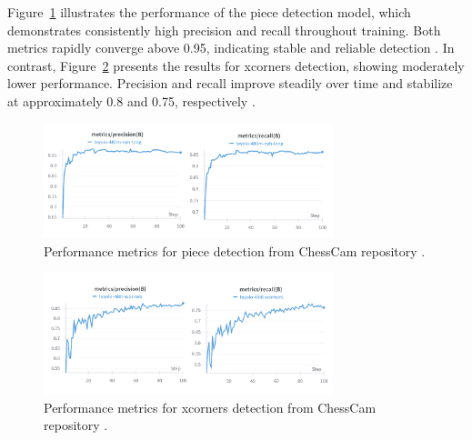 Figure~\ref{fig:chesscam-piece-metrics} illustrates the performance of the piece detection model, which demonstrates consistently high precision and recall throughout training. Both metrics rapidly converge above 0.95, indicating stable and reliable detection \cite{wandb:piece-detection}. In contrast, Figure~\ref{fig:chesscam-xcorners-metrics} presents the results for xcorners detection, showing moderately lower performance. Precision and recall improve steadily over time and stabilize at approximately 0.8 and 0.75, respectively \cite{wandb:xcorner-detection}. \\

\begin{figure}[H]
\centering
\includegraphics[width=0.75\textwidth]{figures/results/machine-learning/piece-metrics.png}
\caption[Performance piece detection (ChessCam)]{Performance metrics for piece detection from ChessCam repository \cite{wandb:piece-detection}.}
\label{fig:chesscam-piece-metrics}
\end{figure}

\begin{figure}[H]
\centering
\includegraphics[width=0.75\textwidth]{figures/results/machine-learning/xcorners-metrics.png}
\caption[Performance xcorners detection (ChessCam)]{Performance metrics for xcorners detection from ChessCam repository \cite{wandb:xcorner-detection}.}
\label{fig:chesscam-xcorners-metrics}
\end{figure}


